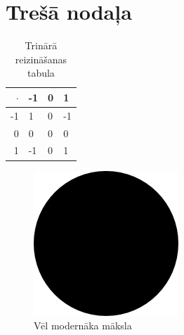\documentclass{LU-nosleguma}
\begin{document}
\section{Trešā nodaļa}

\begin{table}[!htbp]
	\caption{Trinārā reizināšanas tabula}
	\begin{tabular}{r | l | l | l |}
		$\cdot$  & -1 & 0 & 1\\ \hline
		-1 & 1 & 0 & -1\\ \hline
		0 & 0 & 0 & 0\\ \hline
		1 & -1 & 0 & 1\\ \hline
	\end{tabular}
\end{table}

\begin{figure}[!htbp]
	\includegraphics{such_art.png}
	\caption{Vēl modernāka māksla}
\end{figure}



\docpage
\end{document}
